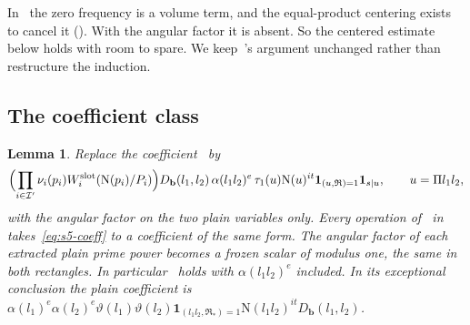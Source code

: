 \documentclass[11pt]{article}
\numberwithin{equation}{section}
\newcommand{\N}{\mathrm N}
\newcommand{\ind}{\mathbf1}
\newtheorem{lemma}{Lemma}
\begin{document}
In~\cite{OAI78} the zero frequency is a volume term, and the equal-product centering exists to cancel it
(\cite[Section~18.3]{OAI78}). With the angular factor it is absent. So the centered estimate below holds with room to
spare. We keep~\cite{OAI78}'s argument unchanged rather than restructure the induction.

\subsection{The coefficient class}\label{sec:s5-coefficients}

\begin{lemma}\label{lem:s5-coefficients}
Replace the coefficient~\cite[eq.~(18.18), Section~18.3]{OAI78} by
\begin{equation}\label{eq:s5-coeff}
 \Bigl(\prod_{i\in\mathcal I'}\nu_i(p_i)W_i^{\rm slot}(\N(p_i)/P_i)\Bigr)D_{\mathbf b}(l_1,l_2)\,
 \alpha(l_1l_2)^e\,\tau_1(u)\N(u)^{it}\ind_{(u,\mathfrak R)=1}\ind_{s\mid u},\qquad u=\Pi l_1l_2,
\end{equation}
with the angular factor on the two plain variables only. Every operation of~\cite{OAI78} in
\cite[Sections~18.1--18.7]{OAI78} takes~\eqref{eq:s5-coeff} to a coefficient of the same form. The angular factor of each
extracted plain prime power becomes a frozen scalar of modulus one, the same in both rectangles.
In particular~\cite[Lemma~18.2]{OAI78} holds with
$\alpha(l_1l_2)^e$ included. In its exceptional conclusion the plain coefficient is
$\alpha(l_1)^e\alpha(l_2)^e\vartheta(l_1)\vartheta(l_2)\ind_{(l_1l_2,\mathfrak R_*)=1}\N(l_1l_2)^{it}D_{\mathbf b}(l_1,l_2)$.
\end{lemma}
\end{document}
